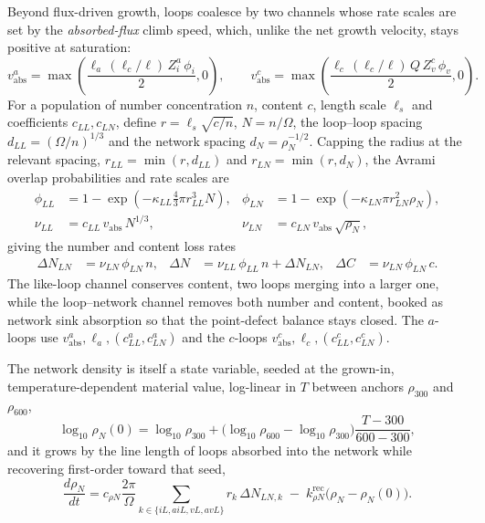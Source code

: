 \documentclass{article}
\begin{document}
Beyond flux-driven growth, loops coalesce by two channels whose rate scales are
set by the \emph{absorbed-flux} climb speed, which, unlike the net growth velocity,
stays positive at saturation:
\begin{equation}
v_{\mathrm{abs}}^{a}=\max\!\left(\frac{\ell_a\,(\ell_c/\ell)\,Z_i^{a}\,\phi_i}{2},0\right),
\qquad
v_{\mathrm{abs}}^{c}=\max\!\left(\frac{\ell_c\,(\ell_c/\ell)\,Q\,Z_v^{c}\,\phi_v}{2},0\right).
\end{equation}
For a population of number concentration $n$, content $c$, length scale $\ell_s$
and coefficients $c_{LL},c_{LN}$, define $r=\ell_s\sqrt{c/n}$, $N=n/\Omega$, the
loop--loop spacing $d_{LL}=(\Omega/n)^{1/3}$ and the network spacing
$d_N=\rho_N^{-1/2}$. Capping the radius at the relevant spacing,
$r_{LL}=\min(r,d_{LL})$ and $r_{LN}=\min(r,d_N)$, the Avrami overlap probabilities
and rate scales are
\begin{align}
\phi_{LL}&=1-\exp\!\left(-\kappa_{LL}\tfrac{4}{3}\pi r_{LL}^3 N\right), &
\phi_{LN}&=1-\exp\!\left(-\kappa_{LN}\pi r_{LN}^2 \rho_N\right),\\
\nu_{LL}&=c_{LL}\,v_{\mathrm{abs}}\,N^{1/3}, &
\nu_{LN}&=c_{LN}\,v_{\mathrm{abs}}\,\sqrt{\rho_N},
\end{align}
giving the number and content loss rates
\begin{align}
\Delta N_{LN}&=\nu_{LN}\,\phi_{LN}\,n, &
\Delta N&=\nu_{LL}\,\phi_{LL}\,n+\Delta N_{LN}, &
\Delta C&=\nu_{LN}\,\phi_{LN}\,c.
\end{align}
The like-loop channel conserves content, two loops merging into a larger one,
while the loop--network channel removes both number and content, booked as network
sink absorption so that the point-defect balance stays closed. The $a$-loops use
$v_{\mathrm{abs}}^{a},\ell_a,(c_{LL}^a,c_{LN}^a)$ and the $c$-loops
$v_{\mathrm{abs}}^{c},\ell_c,(c_{LL}^c,c_{LN}^c)$.

The network density is itself a state variable, seeded at the grown-in,
temperature-dependent material value, log-linear in $T$ between anchors
$\rho_{300}$ and $\rho_{600}$,
\begin{equation}
\log_{10}\rho_N(0)=\log_{10}\rho_{300}+\bigl(\log_{10}\rho_{600}-\log_{10}\rho_{300}\bigr)\frac{T-300}{600-300},
\end{equation}
and it grows by the line length of loops absorbed into the network while
recovering first-order toward that seed,
\begin{equation}
\frac{d\rho_N}{dt}=c_{\rho N}\frac{2\pi}{\Omega}\sum_{k\in\{iL,aiL,vL,avL\}} r_k\,\Delta N_{LN,k}
\;-\;k_{\rho N}^{\mathrm{rec}}\bigl(\rho_N-\rho_N(0)\bigr).
\end{equation}
\end{document}
